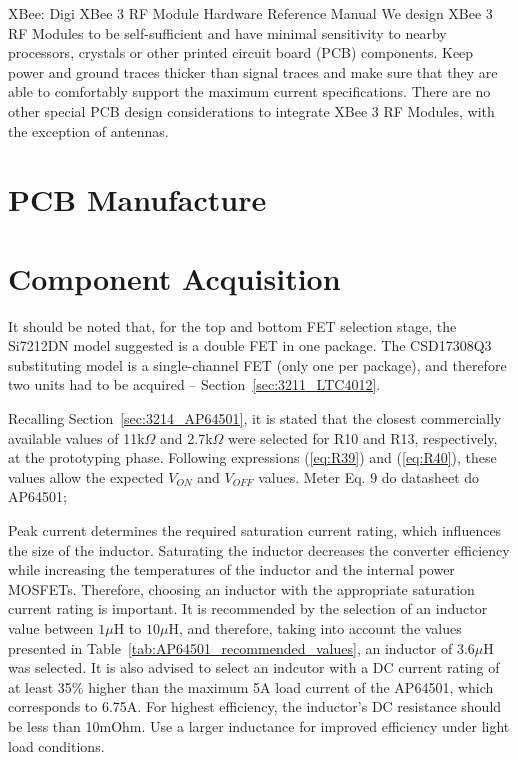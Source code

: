 XBee: Digi XBee 3 RF Module Hardware Reference Manual
We design XBee 3 RF Modules to be self-sufficient and have minimal sensitivity to nearby processors,
crystals or other printed circuit board (PCB) components. Keep power and ground traces thicker than
signal traces and make sure that they are able to comfortably support the maximum current
specifications. There are no other special PCB design considerations to integrate XBee 3 RF Modules,
with the exception of antennas.

\section{PCB Manufacture}\label{sec:51_PCBmanufacture}

\section{Component Acquisition}\label{sec:52_ComponentAcquisition}



It should be noted that, for the top and bottom FET selection stage, the Si7212DN model suggested is a double FET in one package. The CSD17308Q3 substituting model is a single-channel FET (only one per package), and therefore two units had to be acquired -- Section~\ref{sec:3211_LTC4012}.

Recalling Section~\ref{sec:3214_AP64501}, it is stated that the closest commercially available values of 11k$\Omega$ and 2.7k$\Omega$ were selected for R10 and R13, respectively, at the prototyping phase. Following expressions (\ref{eq:R39}) and (\ref{eq:R40}), these values allow the expected $V_{ON}$ and $V_{OFF}$ values.
    Meter Eq. 9 do datasheet do AP64501;
    
    Peak current determines the required saturation current rating, which influences the size of the inductor. Saturating the inductor decreases the converter efficiency while increasing the temperatures of the inductor and the internal power MOSFETs. Therefore, choosing an inductor with the appropriate saturation current rating is important. 
    It is recommended by \cite{AP64501} the selection of an inductor value between $1 \mu$H to $10 \mu$H, and therefore, taking into account the values presented in Table~\ref{tab:AP64501_recommended_values}, an inductor of $3.6 \mu$H was selected. It is also advised to select an indcutor with a DC current rating of at least 35\% higher than the maximum 5A load current of the AP64501, which corresponds to 6.75A.
    For highest efficiency, the inductor's DC resistance should be less than 10mOhm. Use a larger inductance for improved efficiency under light load conditions.


